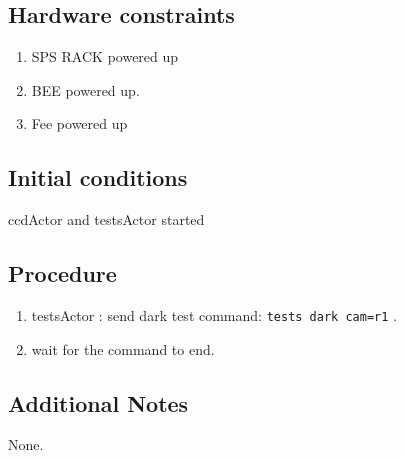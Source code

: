 \subsection{Hardware constraints}

\begin{enumerate}
    \item SPS RACK powered up
    \item \acrshort{BEE} powered up.
    \item Fee powered up
\end{enumerate}

\subsection{Initial conditions}

ccdActor and testsActor started

\subsection{Procedure}

\begin{enumerate}
    \item testsActor : send dark test command: \texttt{tests dark cam=r1} .
    \item wait for the command to end.
\end{enumerate}

\subsection{Additional Notes}
None.
